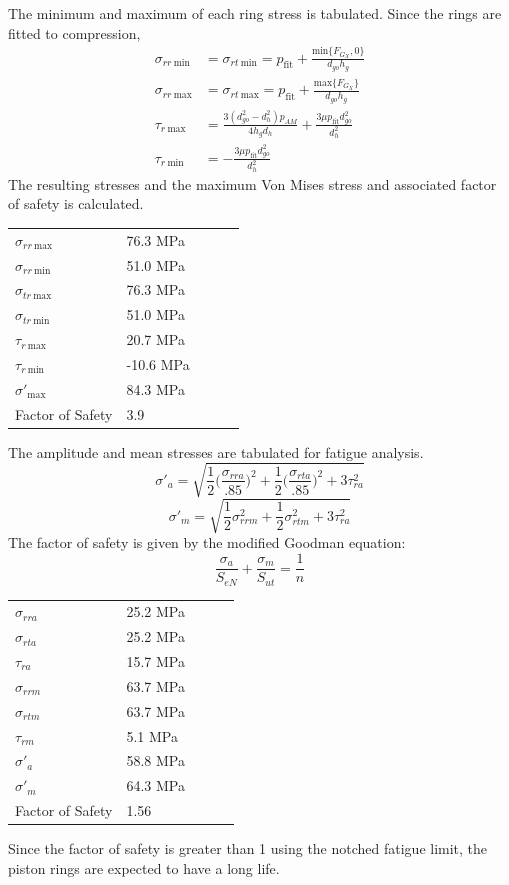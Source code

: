 \documentclass[10pt,a4paper]{article}
\begin{document}
	The minimum and maximum of each ring stress is tabulated. Since the rings are fitted to compression, 
	\begin{align}
		\sigma_{r r\ \text{min}} &= \sigma_{rt\ \text{min}} = p_{\text{fit}} + \frac{\text{min} \{ F_{G_X}, 0 \}}{d_{go} h_g}\\
		\sigma_{rr\ \text{max}} &= \sigma_{rt\ \text{max}} = p_{\text{fit}} + \frac{\text{max} \{ F_{G_X}\}}{d_{go} h_g}\\
		\tau_{r\ \text{max}} &= \frac{3  (d_{go}^2-d_{h}^2) p_{AM}}{4 h_g d_h} + \frac{3 \mu p_{\text{fit}} d_{go}^2}{d_h^2}\\
		\tau_{r\  \text{min}} &= -\frac{3 \mu p_{\text{fit}} d_{go}^2}{d_h^2}
	\end{align}
	The resulting stresses and the maximum Von Mises stress and associated factor of safety is calculated.
\begin{table}[H]
\begin{tabular}{lllll}
 $\sigma_{r r\ \text{max}}$ & 76.3 MPa \\
 $\sigma_{r r\ \text{min}}$& 51.0 MPa \\
 $\sigma_{t r\ \text{max}}$ & 76.3 MPa \\
 $\sigma_{t r\ \text{min}}$& 51.0 MPa \\
 $\tau_{r\ \text{max}}$ &  20.7 MPa \\
 $\tau_{r\  \text{min}}$&  -10.6 MPa \\
 $\sigma'_{\text{max}}$ & 84.3 MPa\\
 Factor of Safety & 3.9
\end{tabular}
\end{table}
The amplitude and mean stresses are tabulated for fatigue analysis. 
$$\sigma'_a = \sqrt{\frac{1}{2} \big( \frac{\sigma_{rr a}}{.85} \big)^2 + \frac{1}{2} \big( \frac{\sigma_{rt a}}{.85} \big)^2 + 3 \tau_{r a}^2}$$
$$\sigma'_m = \sqrt{\frac{1}{2} \sigma_{rr m}^2 + \frac{1}{2} \sigma_{rt m}^2 + 3 \tau_{r a}^2}$$
The factor of safety is given by the modified Goodman equation:
$$\frac{\sigma_a}{S_{eN}} + \frac{\sigma_m}{S_{ut}} = \frac{1}{n} $$

\begin{table}[H]
\begin{tabular}{lllll}
 $\sigma_{r r a}$ & 25.2 MPa \\
 $\sigma_{r t a}$& 25.2 MPa \\
 $\tau_{r a}$&  15.7 MPa \\
 $\sigma_{r r m}$ & 63.7 MPa \\
 $\sigma_{r t m}$& 63.7 MPa \\
 $\tau_{r m}$&  5.1 MPa \\
 $\sigma'_{a}$ & 58.8 MPa\\
 $\sigma'_{m}$ & 64.3 MPa\\
 Factor of Safety & 1.56
\end{tabular}
\end{table}
Since the factor of safety is greater than 1 using the notched fatigue limit, the piston rings are expected to have a long life.
\end{document}
